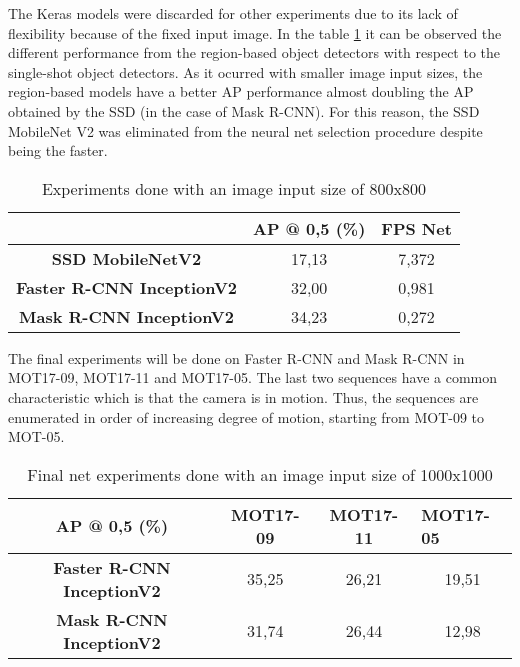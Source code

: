 The Keras models were discarded for other experiments due to its lack of flexibility because of the fixed input image. In the table \ref{tab:net_exp_3}  it can be observed the different performance from the region-based object detectors with respect to the single-shot object detectors. As it ocurred with smaller image input sizes, the region-based models have a better AP performance almost doubling the AP obtained by the SSD (in the case of Mask R-CNN). For this reason, the SSD MobileNet V2 was eliminated from the neural net selection procedure despite being the faster. 
\begin{table}[H]
\tiny
\begin{center}
\begin{tabular}{|c|c|c|}
\hline
\textbf{}                         & \textbf{AP @ 0,5 (\%)} & \textbf{FPS Net} \\ \hline
\textbf{SSD MobileNetV2}          & 17,13                  & 7,372             \\ \hline
\textbf{Faster R-CNN InceptionV2} & 32,00                  & 0,981            \\ \hline
\textbf{Mask R-CNN InceptionV2}   & 34,23                  & 0,272            \\ \hline
\end{tabular}
\end{center}
\caption{Experiments done with an image input size of 800x800}
\label{tab:net_exp_3}
\end{table}
The final experiments will be done on Faster R-CNN and Mask R-CNN in MOT17-09, MOT17-11 and MOT17-05. The last two sequences have a common characteristic which is that the camera is in motion. Thus, the sequences are enumerated in order of increasing degree of motion, starting from MOT-09 to MOT-05.
\begin{table}[H]
\tiny
\begin{center}
\begin{tabular}{|c|c|c|c|}
\hline
\textbf{AP @ 0,5 (\%)}            & \textbf{MOT17-09} & \textbf{MOT17-11} & \multicolumn{1}{l|}{\textbf{MOT17-05}} \\ \hline
\textbf{Faster R-CNN InceptionV2} & 35,25             & 26,21             & 19,51                                  \\ \hline
\textbf{Mask R-CNN InceptionV2}   & 31,74             & 26,44             & 12,98                                  \\ \hline
\end{tabular}
\end{center}
\caption{Final net experiments done with an image input size of 1000x1000}
\label{tab:net_exp_4}
\end{table}

